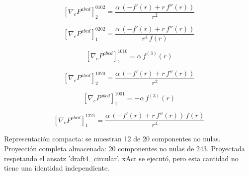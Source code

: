 \documentclass[11pt]{article}
\begin{document}
\par\smallskip
\begin{dmath*}[breakdepth={5}]
\left[\nabla_e P^{abcd}\right]_{2}^{0102} = \frac{\alpha\,\left(-f'\!\left(r\right) + r\,f''\!\left(r\right)\right)}{{r}^{2}}
\end{dmath*}
\par\smallskip
\begin{dmath*}[breakdepth={5}]
\left[\nabla_e P^{abcd}\right]_{1}^{0202} = \frac{\alpha\,\left(-f'\!\left(r\right) + r\,f''\!\left(r\right)\right)}{{r}^{4}\,f\!\left(r\right)}
\end{dmath*}
\par\smallskip
\begin{dmath*}[breakdepth={5}]
\left[\nabla_e P^{abcd}\right]_{1}^{1010} = \alpha\,f^{(3)}\!\left(r\right)
\end{dmath*}
\par\smallskip
\begin{dmath*}[breakdepth={5}]
\left[\nabla_e P^{abcd}\right]_{2}^{1020} = \frac{\alpha\,\left(-f'\!\left(r\right) + r\,f''\!\left(r\right)\right)}{{r}^{2}}
\end{dmath*}
\par\smallskip
\begin{dmath*}[breakdepth={5}]
\left[\nabla_e P^{abcd}\right]_{1}^{1001} = -\alpha\,f^{(3)}\!\left(r\right)
\end{dmath*}
\par\smallskip
\begin{dmath*}[breakdepth={5}]
\left[\nabla_e P^{abcd}\right]_{1}^{1221} = \frac{\alpha\,\left(-f'\!\left(r\right) + r\,f''\!\left(r\right)\right)\,f\!\left(r\right)}{{r}^{4}}
\end{dmath*}
\par\smallskip
Representación compacta: se muestran 12 de 20 componentes no nulas.
Proyección completa almacenada: 20 componentes no nulas de 243. Proyectada respetando el ansatz 'draft4\_circular'. xAct se ejecutó, pero esta cantidad no tiene una identidad independiente.\par\medskip
{}
\end{document}
